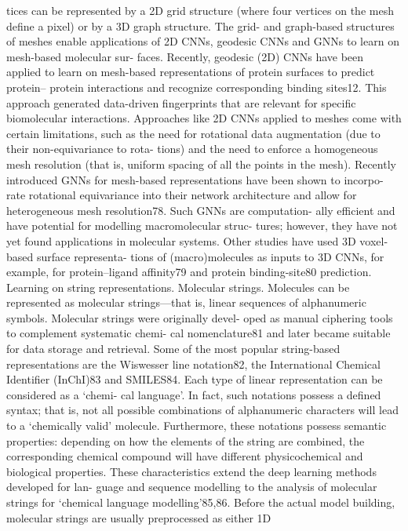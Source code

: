 tices can be represented by a 2D grid structure (where four vertices
on the mesh define a pixel) or by a 3D graph structure. The grid- and
graph-based structures of meshes enable applications of 2D CNNs,
geodesic CNNs and GNNs to learn on mesh-based molecular sur-
faces. Recently, geodesic (2D) CNNs have been applied to learn on
mesh-based representations of protein surfaces to predict protein–
protein interactions and recognize corresponding binding sites12.
This approach generated data-driven fingerprints that are relevant
for specific biomolecular interactions. Approaches like 2D CNNs
applied to meshes come with certain limitations, such as the need for
rotational data augmentation (due to their non-equivariance to rota-
tions) and the need to enforce a homogeneous mesh resolution (that
is, uniform spacing of all the points in the mesh). Recently introduced
GNNs for mesh-based representations have been shown to incorpo-
rate rotational equivariance into their network architecture and allow
for heterogeneous mesh resolution78. Such GNNs are computation-
ally efficient and have potential for modelling macromolecular struc-
tures; however, they have not yet found applications in molecular
systems. Other studies have used 3D voxel-based surface representa-
tions of (macro)molecules as inputs to 3D CNNs, for example, for
protein–ligand affinity79 and protein binding-site80 prediction.
Learning on string representations. Molecular strings. Molecules
can be represented as molecular strings—that is, linear sequences
of alphanumeric symbols. Molecular strings were originally devel-
oped as manual ciphering tools to complement systematic chemi-
cal nomenclature81 and later became suitable for data storage and
retrieval. Some of the most popular string-based representations are
the Wiswesser line notation82, the International Chemical Identifier
(InChI)83 and SMILES84.
Each type of linear representation can be considered as a ‘chemi-
cal language’. In fact, such notations possess a defined syntax; that
is, not all possible combinations of alphanumeric characters will
lead to a ‘chemically valid’ molecule. Furthermore, these notations
possess semantic properties: depending on how the elements of the
string are combined, the corresponding chemical compound will
have different physicochemical and biological properties. These
characteristics extend the deep learning methods developed for lan-
guage and sequence modelling to the analysis of molecular strings
for ‘chemical language modelling’85,86. Before the actual model
building, molecular strings are usually preprocessed as either 1D
